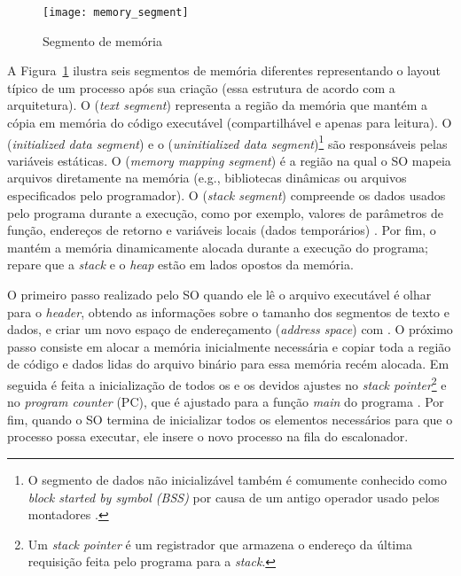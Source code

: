 \begin{figure}[!h]
  \centering
  \texttt{[image: memory\_segment]} 
  \caption{Segmento de memória}
  \label{fig:memory_segment} 
\end{figure}

A Figura~\ref{fig:memory_segment} ilustra seis segmentos de memória diferentes
representando o layout típico de um processo após sua criação (essa
estrutura  de acordo com a arquitetura). O  (\emph{text segment}) representa a região da memória que mantém a
cópia em memória do código
executável (compartilhável e apenas para leitura). O  (\emph{initialized data segment})
e o  (\emph{uninitialized data segment})\footnote{O segmento de dados não
inicializável também é comumente conhecido como \emph{block started by symbol
(BSS)} por causa de um antigo operador usado pelos montadores \citep{gdb}.}
são responsáveis pelas variáveis estáticas. O
 (\emph{memory mapping
segment}) é a região na qual o SO mapeia arquivos diretamente na memória (e.g.,
bibliotecas dinâmicas ou arquivos especificados pelo programador). O
 (\emph{stack segment}) compreende os dados
usados pelo programa durante a execução, como por exemplo, valores de
parâmetros de função, endereços de retorno e variáveis locais (dados
temporários) \citep{silberschatz}. Por fim, o 
mantém a memória dinamicamente alocada durante a execução do programa; repare
que a \emph{stack} e o \emph{heap} estão em lados opostos da memória.

O primeiro passo realizado pelo SO quando ele lê o arquivo executável é olhar
para o \emph{header}, obtendo as informações sobre o tamanho dos segmentos de
texto e dados, e criar
um novo espaço de endereçamento (\emph{address space}) com . O próximo passo consiste em alocar a memória inicialmente necessária
e copiar toda a região de código e dados lidas do
arquivo binário para essa memória recém alocada. Em seguida é feita a
inicialização de todos os  e os devidos ajustes no \emph{stack
pointer}\footnote{Um \emph{stack pointer} é um registrador que armazena o
endereço da última requisição feita pelo programa para a \emph{stack}.} e no
\emph{program counter} (PC), que é ajustado para a função
\emph{main} do programa \citep{patterson}. Por fim, quando o SO termina de
inicializar todos os elementos necessários para que o processo possa executar,
ele insere o novo processo na fila do escalonador.

